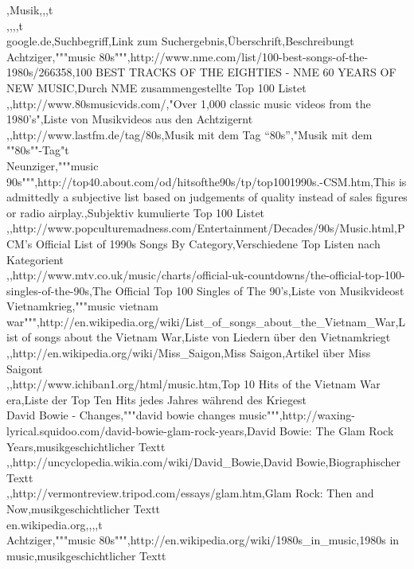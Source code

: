 ,Musik,,,t\\
,,,,t\\
google.de,Suchbegriff,Link zum Suchergebnis,Überschrift,Beschreibungt\\
Achtziger,"""music 80s""",http://www.nme.com/list/100-best-songs-of-the-1980s/266358,100 BEST TRACKS OF THE EIGHTIES - NME 60 YEARS OF NEW MUSIC,Durch NME zusammengestellte Top 100 Listet\\
,,http://www.80smusicvids.com/,"Over 1,000 classic music videos from the 1980's",Liste von Musikvideos aus den Achtzigernt\\
,,http://www.lastfm.de/tag/80s,Musik mit dem Tag “80s”,"Musik mit dem ""80s""-Tag"t\\
Neunziger,"""music 90s""",http://top40.about.com/od/hitsofthe90s/tp/top1001990s.-CSM.htm,This is admittedly a subjective list based on judgements of quality instead of sales figures or radio airplay.,Subjektiv kumulierte Top 100 Listet\\
,,http://www.popculturemadness.com/Entertainment/Decades/90s/Music.html,PCM's Official List of 1990s Songs By Category,Verschiedene Top Listen nach Kategorient\\
,,http://www.mtv.co.uk/music/charts/official-uk-countdowns/the-official-top-100-singles-of-the-90s,The Official Top 100 Singles of The 90's,Liste von Musikvideost\\
Vietnamkrieg,"""music vietnam war""",http://en.wikipedia.org/wiki/List_of_songs_about_the_Vietnam_War,List of songs about the Vietnam War,Liste von Liedern über den Vietnamkriegt\\
,,http://en.wikipedia.org/wiki/Miss_Saigon,Miss Saigon,Artikel über Miss Saigont\\
,,http://www.ichiban1.org/html/music.htm,Top 10 Hits of the Vietnam War era,Liste der Top Ten Hits jedes Jahres während des Kriegest\\
David Bowie - Changes,"""david bowie changes music""",http://waxing-lyrical.squidoo.com/david-bowie-glam-rock-years,David Bowie: The Glam Rock Years,musikgeschichtlicher Textt\\
,,http://uncyclopedia.wikia.com/wiki/David_Bowie,David Bowie,Biographischer Textt\\
,,http://vermontreview.tripod.com/essays/glam.htm,Glam Rock: Then and Now,musikgeschichtlicher Textt\\
en.wikipedia.org,,,,t\\
Achtziger,"""music 80s""",http://en.wikipedia.org/wiki/1980s_in_music,1980s in music,musikgeschichtlicher Textt\\
